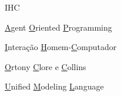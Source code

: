 \begin{listofabbrv}{IHC}
		\item[AOP] \underline{A}gent \underline{O}riented \underline{P}rogramming
        \item[IHC] \underline{I}ntera\c{c}\~{a}o \underline{H}omem-\underline{C}omputador
        \item[OCC] \underline{O}rtony \underline{C}lore e \underline{C}ollins
        \item[UML] \underline{U}nified \underline{M}odeling \underline{L}anguage
\end{listofabbrv}

